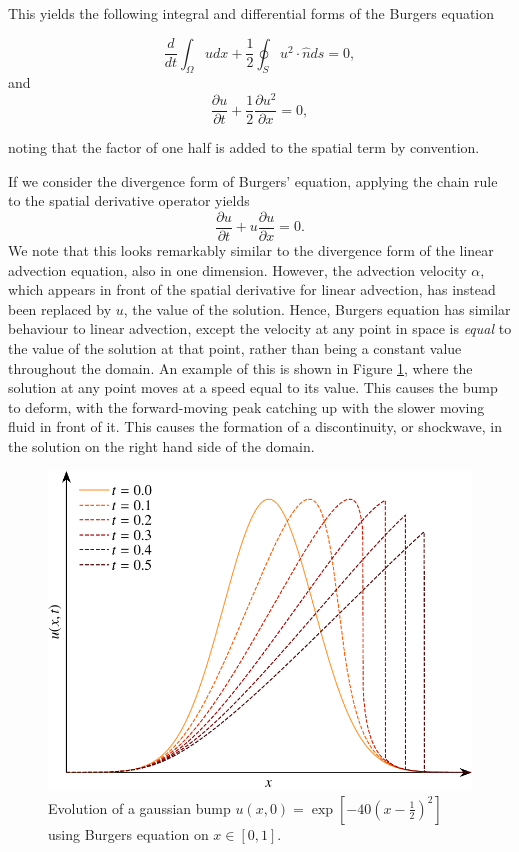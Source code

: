 This yields the following integral and differential forms of the Burgers equation
\begin{eqBox}
\begin{equation}
	 \frac{d}{dt}\int_\Omega u dx + \frac{1}{2}\oint_S u^2 \cdot \hat{n} ds =  0,
\end{equation}
and
\begin{equation}
	\frac{\partial u}{\partial t} +  \frac{1}{2} \frac{\partial u^2}{\partial x} = 0,
\end{equation}
\end{eqBox}
noting that the factor of one half is added to the spatial term by convention.

If we consider the divergence form of Burgers' equation, applying the chain rule to the spatial derivative operator yields
\begin{equation}
	\frac{\partial u}{\partial t} +  u \frac{\partial u}{\partial x} = 0.
\end{equation}
We note that this looks remarkably similar to the divergence form of the linear advection equation, also in one dimension. However, the advection velocity $\alpha$, which appears in front of the spatial derivative for linear advection, has instead been replaced by $u$, the value of the solution. Hence, Burgers equation has similar behaviour to linear advection, except the velocity at any point in space is {\it equal} to the value of the solution at that point, rather than being a constant value throughout the domain. An example of this is shown in Figure \ref{fig:burgers_equation}, where the solution at any point moves at a speed equal to its value. This causes the bump to deform, with the forward-moving peak catching up with the slower moving fluid in front of it. This causes the formation of a discontinuity, or shockwave, in the solution on the right hand side of the domain.
\begin{figure}[htbp]
	\centering
	\includegraphics[width=0.65\linewidth]{Pictures/burgers_equation}
	\caption{Evolution of a gaussian bump $u(x,0)=\exp\left[-40\left(x-\frac{1}{2}\right)^2\right]$ using Burgers equation on $x\in[0,1]$.}
	\label{fig:burgers_equation}
\end{figure}
